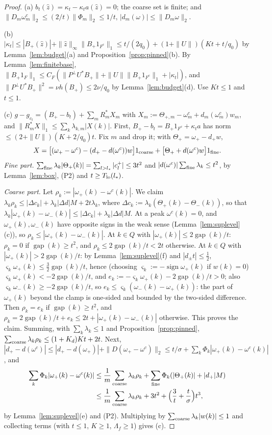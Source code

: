 \documentclass[10pt]{amsart}
\theoremstyle{definition}
\theoremstyle{remark}
\newcommand{\sgn}{\operatorname{sign}}
\newcommand{\gap}{\operatorname{gap}}
\newcommand{\zh}{\hat z}
\begin{document}
\begin{proof}
(a) $b_t(\zh)=\kappa_t-\kappa_ta(\zh)=0$; the coarse set is finite; and
$\|D_m\omega^c_m\|_2\le(2/t)\|\Phi_m\|_2\le1/t$, $|d_m(\omega)|\le
\|D_m\omega\|_2$.

(b) $|\kappa_t|\le|B_+(\zh)|+\|\zh\|_\infty\|B_+1_{F^c}\|_1\le t/(2q_0)+
(1+\|U\|)(Kt+t/q_0)$ by Lemma~\ref{lem:budget}(a) and
Proposition~\ref{prop:pinned}(b).  By Lemma~\ref{lem:finitebase},
$\|B_+1_F\|_1\le C_F(\|P^\perp U^*B_+\|+\|U\|\|B_+1_{F^c}\|_1+|\kappa_t|)$,
and $\|P^\perp U^*B_+\|^2=\nu h(B_+)\le2\nu/q_0$ by
Lemma~\ref{lem:budget}(d).  Use $Kt\le1$ and $t\le1$.

(c) $g-g_{c_t}=(B_+-b_t)+\sum_mR_m^*X_m$ with $X_m:=\Theta_{+,m}-\omega^c_m+
d_m(\omega^c_m)w_m$, and $\|R^*_mX\|_1\le\sum_k\lambda_{k,m}|X(k)|$.  First,
$B_+-b_t=B_+1_{F^c}+\kappa_ta$ has norm $\le(2+\|U\|)(K+2/q_0)t$.  Fix $m$
and drop it; with $\Theta_+=\omega_+-d_+w$,
\[
 X=\big[(\omega_+-\omega^c)-(d_+-d(\omega^c))w\big]1_{\rm coarse}+
 \big[\Theta_++d(\omega^c)w\big]1_{\rm fine}.
\]
\emph{Fine part.}  $\sum_{\rm fine}\lambda_k|\Theta_+(k)|=\sum_{l>l_*}
|c^+_l|\le3t^2$ and $|d(\omega^c)|\sum_{\rm fine}\lambda_k\le t^2$, by
Lemma~\ref{lem:box}, (P2) and $t\ge T_{\rm lo}(l_*)$.

\emph{Coarse part.}  Let $\rho_k:=|\omega_+(k)-\omega^c(k)|$.  We claim
$\lambda_k\rho_k\le|\Delta c_k|+\lambda_k|\Delta d|M+2t\lambda_k$, where
$\Delta c_k:=\lambda_k(\Theta_+(k)-\Theta_-(k))$, so that
$\lambda_k|\omega_+(k)-\omega_-(k)|\le|\Delta c_k|+\lambda_k|\Delta d|M$.
At a peak $\omega^c(k)=0$, and $\omega_+(k),\omega_-(k)$ have opposite signs
in the weak sense (Lemma~\ref{lem:suplevel}(c)), so $\rho_k\le|\omega_+(k)-
\omega_-(k)|$.  At $k\in Q$ with $|\omega_+(k)|\le2\gap(k)/t$: $\rho_k=0$ if
$\gap(k)\ge t^2$, and $\rho_k\le2\gap(k)/t<2t$ otherwise.  At $k\in Q$ with
$|\omega_+(k)|>2\gap(k)/t$: by Lemma~\ref{lem:suplevel}(f) and $|d_\pm t|\le
\frac12$, $\varsigma_k\omega_+(k)\le\frac32\gap(k)/t$, hence (choosing
$\varsigma_k:=-\sgn\omega_+(k)$ if $w(k)=0$) $\varsigma_k\omega_+(k)<
-2\gap(k)/t$, and $e_k:=-\varsigma_k\omega_+(k)-2\gap(k)/t>0$; also
$\varsigma_k\omega_-(k)\ge-2\gap(k)/t$, so $e_k\le\varsigma_k(\omega_-(k)-
\omega_+(k))$: the part of $\omega_+(k)$ beyond the clamp is one-sided and
bounded by the two-sided difference.  Then $\rho_k=e_k$ if $\gap(k)\ge t^2$,
and $\rho_k=2\gap(k)/t+e_k\le2t+|\omega_+(k)-\omega_-(k)|$ otherwise.  This
proves the claim.  Summing, with $\sum_k\lambda_k\le1$ and
Proposition~\ref{prop:pinned}, $\sum_{\rm coarse}\lambda_k\rho_k\le
(1+K_d)Kt+2t$.  Next, $|d_+-d(\omega^c)|\le|d_+-d(\omega_+)|+\|D(\omega_+-
\omega^c)\|_2\le t/\sigma+\sum_k\Phi_k|\omega_+(k)-\omega^c(k)|$, and
\begin{align*}
 \sum_k\Phi_k|\omega_+(k)-\omega^c(k)|&\le\frac1m\sum_{\rm coarse}
 \lambda_k\rho_k+\sum_{\rm fine}\Phi_k(|\Theta_+(k)|+|d_+|M)\\
 &\le\frac1m\sum_{\rm coarse}\lambda_k\rho_k+3t^2+\Big(\frac3t+\frac
 t\sigma\Big)t^3,
\end{align*}
by Lemma~\ref{lem:suplevel}(e) and (P2).  Multiplying by
$\sum_{\rm coarse}\lambda_k|w(k)|\le1$ and collecting terms (with $t\le1$,
$K\ge1$, $\Lambda_f\ge1$) gives (c).


\end{proof}
\end{document}

